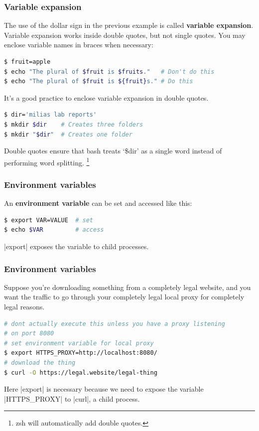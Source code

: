 \begin{frame}[fragile]
\frametitle{Variable expansion}
The use of the dollar sign in the previous example is called
\textbf{variable expansion}. Variable expansion works inside double quotes, but
not single quotes. You may enclose variable names in braces when
necessary:
\begin{lstlisting}[language=bash]
$ fruit=apple
$ echo "The plural of $fruit is $fruits."   # Don't do this
$ echo "The plural of $fruit is ${fruit}s." # Do this
\end{lstlisting}
It's a good practice to enclose variable expansion in double quotes.
\begin{lstlisting}[language=bash]
$ dir='milias lab reports'
$ mkdir $dir    # Creates three folders
$ mkdir "$dir"  # Creates one folder
\end{lstlisting}
\begin{block}
    
Double quotes ensure that bash treats `\$dir' as a single word instead of performing word splitting. 
\footnote{zsh will automatically add double quotes.}
\end{block}
\end{frame}

\begin{frame}[fragile]
\frametitle{Environment variables}
An \textbf{environment variable} can be set and accessed like this:
\begin{lstlisting}[language=bash]
$ export VAR=VALUE  # set
$ echo $VAR         # access
\end{lstlisting}
\cverb|export| exposes the variable to child processes.
\end{frame}

\begin{frame}[fragile]
\frametitle{Environment variables}
Suppose you're downloading something from a completely legal website,
and you want the traffic to go through your completely legal local proxy
for completely legal reasons.
\begin{lstlisting}[language=bash]
# dont actually execute this unless you have a proxy listening
# on port 8080
# set environment variable for local proxy
$ export HTTPS_PROXY=http://localhost:8080/
# download the thing
$ curl -O https://legal.website/legal-thing
\end{lstlisting}
Here \cverb|export| is necessary because we need to expose the variable
\cverb|HTTPS_PROXY| to \cverb|curl|, a child process.
\end{frame}

